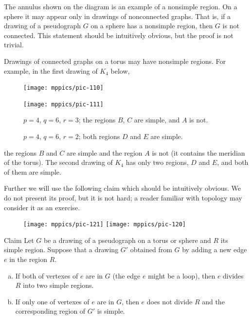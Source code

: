 The annulus shown on the diagram is an example of a nonsimple region.
On a sphere it may appear only in drawings of nonconnected graphs.
That is, if a drawing of a pseudograph $G$ on a sphere has a nonsimple region, then $G$ is not connected.
This statement should be intuitively obvious, but the proof is not trivial.  

Drawings of connected graphs on a torus may have nonsimple regions.
For example, in the first drawing of $K_4$ below,
\begin{figure}[h!]
\begin{minipage}{.45\textwidth}
\centering
\texttt{[image: mppics/pic-110]}
\end{minipage}
\hfill
\begin{minipage}{.45\textwidth}
\centering
\texttt{[image: mppics/pic-111]}
\end{minipage}

\medskip

\begin{minipage}{.45\textwidth}
\centering
\caption*{$p=4$, $q=6$, $r=3$; the regions $B$, $C$ are simple, and $A$ is not.}
\end{minipage}\hfill
\begin{minipage}{.45\textwidth}
\centering
\caption*{$p=4$, $q=6$, $r=2$; both regions $D$ and $E$ are simple.}
\end{minipage}
\vskip-4mm
\end{figure} 
the regions $B$ and $C$ are simple and the region $A$ is not (it contains the meridian of the torus).
The second drawing of $K_4$ has only two regions, $D$ and $E$, and both of them are simple.


Further we will use the following claim which should be intuitively obvious.
We do not present its proof, but it is not hard;
a reader familiar with topology may consider it as an exercise.

{

\begin{figure}
\vskip-4mm
\centering
\texttt{[image: mppics/pic-121]}
\medskip
\texttt{[image: mppics/pic-120]}
\end{figure}

\begin{thm}{Claim}\label{clm:cut}
Let $G$ be a drawing of a pseudograph on a torus or sphere and $R$ its simple region.
Suppose that a drawing $G'$ obtained from $G$ by adding a new edge $e$ in the region $R$.
\begin{enumerate}[(a)]
\item If both of vertexes of $e$ are in $G$ (the edge $e$ might be a loop), then $e$ divides $R$ into two simple regions.
\item If only one of vertexes of $e$ are in $G$, then $e$ does not divide $R$ and the corresponding region of $G'$ is simple.
\end{enumerate}
\end{thm}

}

